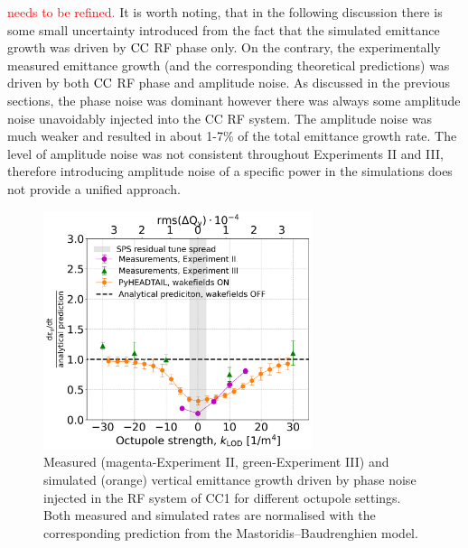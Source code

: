 \textcolor{red}{needs to be refined.}
It is worth noting, that in the following discussion there is some small uncertainty introduced from the fact that the simulated emittance growth was driven by ${\mathrm{CC}}$ RF phase only. On the contrary, the experimentally measured emittance growth (and the corresponding theoretical predictions) was driven by both ${\mathrm{CC}}$ RF phase and amplitude noise. As discussed in the previous sections, the phase noise was dominant however there was always some amplitude noise unavoidably injected into the CC RF system. The amplitude noise was much weaker and resulted in about 1-7$\%$ of the total emittance growth rate. The level of amplitude noise was not consistent throughout Experiments II and III, therefore introducing amplitude noise of a specific power in the simulations does not provide a unified approach. 


\begin{figure}[!htb]
   \centering         
   \includegraphics[width=0.7\textwidth]{images/Ch8/deyRates_sps_270GeV_PN1e-8_400MHz_SPS_NewWakesAllcontributions_appendWakes_y-plane_WakesONvsOFF_QpxQpy1_6D_Nb5e5_intensity3e10Scan_simulations_vs_measurements_magenta_new_legend_IPAC22_May_and_September_2022_for_thesis.png}
       \caption{Measured (magenta-Experiment II, green-Experiment III) and simulated (orange) vertical emittance growth driven by phase noise injected in the RF system of CC1 for different octupole settings. Both measured and simulated rates are normalised with the corresponding prediction from the Mastoridis--Baudrenghien model.}
       \label{fig:cc_md_2022_measurement_vs_pyheadtail_simualtion_sep22}
\end{figure}


